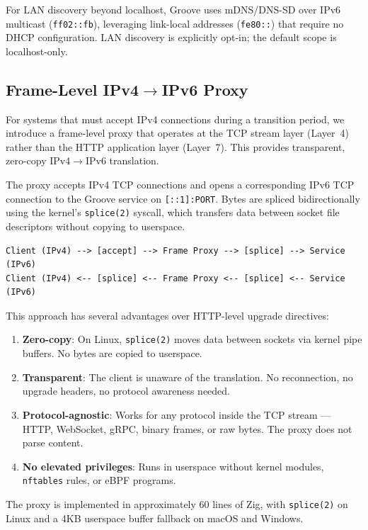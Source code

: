 \documentclass[11pt,a4paper]{article}
\begin{document}
For LAN discovery beyond localhost, Groove uses mDNS/DNS-SD over IPv6
multicast (\texttt{ff02::fb}), leveraging link-local addresses (\texttt{fe80::})
that require no DHCP configuration. LAN discovery is explicitly opt-in; the
default scope is localhost-only.

\subsection{Frame-Level IPv4$\rightarrow$IPv6 Proxy}

For systems that must accept IPv4 connections during a transition period,
we introduce a frame-level proxy that operates at the TCP stream layer
(Layer~4) rather than the HTTP application layer (Layer~7). This provides
transparent, zero-copy IPv4$\rightarrow$IPv6 translation.

The proxy accepts IPv4 TCP connections and opens a corresponding IPv6 TCP
connection to the Groove service on \texttt{[::1]:PORT}. Bytes are spliced
bidirectionally using the kernel's \texttt{splice(2)} syscall, which
transfers data between socket file descriptors without copying to userspace.

\begin{lstlisting}[caption={Frame-level proxy data path}]
Client (IPv4) --> [accept] --> Frame Proxy --> [splice] --> Service (IPv6)
Client (IPv4) <-- [splice] <-- Frame Proxy <-- [splice] <-- Service (IPv6)
\end{lstlisting}

This approach has several advantages over HTTP-level upgrade directives:

\begin{enumerate}
\item \textbf{Zero-copy}: On Linux, \texttt{splice(2)} moves data between
  sockets via kernel pipe buffers. No bytes are copied to userspace.
\item \textbf{Transparent}: The client is unaware of the translation. No
  reconnection, no upgrade headers, no protocol awareness needed.
\item \textbf{Protocol-agnostic}: Works for any protocol inside the TCP
  stream --- HTTP, WebSocket, gRPC, binary frames, or raw bytes. The proxy
  does not parse content.
\item \textbf{No elevated privileges}: Runs in userspace without kernel
  modules, \texttt{nftables} rules, or eBPF programs.
\end{enumerate}

The proxy is implemented in approximately 60 lines of Zig, with
\texttt{splice(2)} on Linux and a 4KB userspace buffer fallback on
macOS and Windows.
\end{document}
